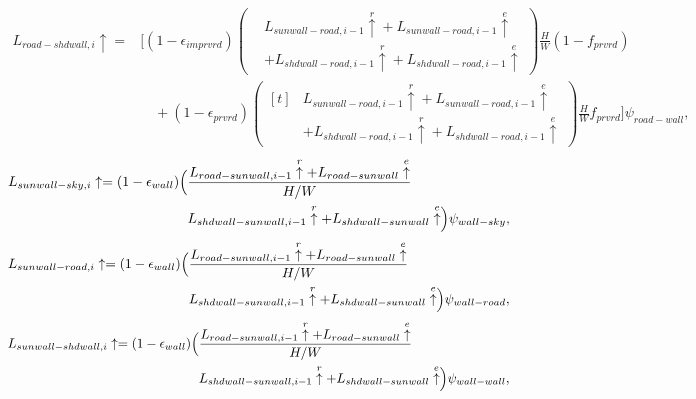 \documentclass[12pt,authoryear]{elsarticle}
\numberwithin{equation}{section} %
\begin{document}
\begin{equation}
\begin{aligned}
L_{road-shdwall,i}\uparrow
={}&
\Biggl[(1-\epsilon_{imprvrd})
\left(\begin{aligned}
&L_{sunwall-road,i-1}\overset{r}{\uparrow}
 +L_{sunwall-road,i-1}\overset{e}{\uparrow} \\
&+L_{shdwall-road,i-1}\overset{r}{\uparrow}
 +L_{shdwall-road,i-1}\overset{e}{\uparrow}
\end{aligned}\right)\frac{H}{W}(1-f_{prvrd})\\
&\quad+(1-\epsilon_{prvrd})
\left(\begin{aligned}[t]
 &L_{sunwall-road,i-1}\overset{r}{\uparrow}
 +L_{sunwall-road,i-1}\overset{e}{\uparrow} \\
 &+L_{shdwall-road,i-1}\overset{r}{\uparrow}
 +L_{shdwall-road,i-1}\overset{e}{\uparrow}
\end{aligned}\right)\frac{H}{W}f_{prvrd}\Biggr]\psi_{road-wall},
\end{aligned}
\end{equation}
\begin{equation}
\begin{aligned}
L_{sunwall-sky,i}\uparrow=(1-\epsilon_{wall})
\Bigl(
&\frac{L_{road-sunwall,i-1}\overset{r}{\uparrow}+L_{road-sunwall}\overset{e}{\uparrow}}{H/W} \\
&L_{shdwall-sunwall,i-1}\overset{r}{\uparrow}+L_{shdwall-sunwall}\overset{e}{\uparrow}
\Bigr) \psi_{wall-sky},
\end{aligned}
\end{equation}
\begin{equation}
\begin{aligned}
L_{sunwall-road,i}\uparrow=(1-\epsilon_{wall})
\Bigl(
&\frac{L_{road-sunwall,i-1}\overset{r}{\uparrow}+L_{road-sunwall}\overset{e}{\uparrow}}{H/W} \\
&L_{shdwall-sunwall,i-1}\overset{r}{\uparrow}+L_{shdwall-sunwall}\overset{e}{\uparrow}
\Bigr) \psi_{wall-road},
\end{aligned}
\end{equation}
\begin{equation}
\begin{aligned}
L_{sunwall-shdwall,i}\uparrow=(1-\epsilon_{wall})
\Bigl(
&\frac{L_{road-sunwall,i-1}\overset{r}{\uparrow}+L_{road-sunwall}\overset{e}{\uparrow}}{H/W} \\
&L_{shdwall-sunwall,i-1}\overset{r}{\uparrow}+L_{shdwall-sunwall}\overset{e}{\uparrow}
\Bigr) \psi_{wall-wall},
\end{aligned}
\end{equation}
\end{document}
